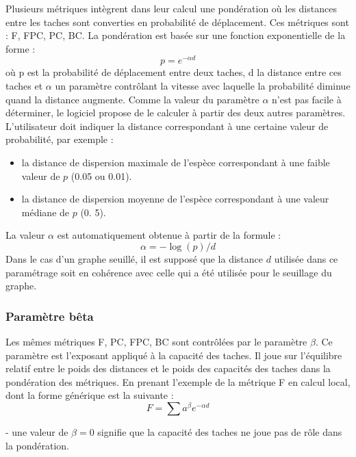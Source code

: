 \documentclass{article}
\begin{document}
Plusieurs métriques intègrent dans leur calcul une pondération où les distances entre les taches sont converties en probabilité de déplacement. Ces métriques sont : F, FPC, PC, BC. La pondération est basée sur une fonction exponentielle de la forme :
\begin{equation*}
p={e}^{-\mathit{\alpha d}}
\end{equation*}
où p est la probabilité de déplacement entre deux taches, d la distance entre ces taches et $\alpha$ un paramètre contrôlant la vitesse avec laquelle la probabilité diminue quand la distance augmente. Comme la valeur du paramètre $\alpha$ n’est pas facile à déterminer, le logiciel propose de le calculer à partir des deux autres paramètres. L’utilisateur doit indiquer la distance correspondant à une certaine valeur de probabilité, par exemple :
\begin{itemize}
	\item la distance de dispersion maximale de l’espèce correspondant à une faible valeur de $p$ (0.05 ou 0.01).
	\item la distance de dispersion moyenne de l’espèce correspondant à une valeur médiane de $p$ (0. 5).
\end{itemize}
La valeur $\alpha $ est automatiquement obtenue à partir de la formule :
\begin{equation*}
\alpha =-\log \left(p\right)/{d}
\end{equation*}
Dans le cas d’un graphe seuillé, il est supposé que la distance $d$ utilisée dans ce paramétrage soit en cohérence avec celle qui a été utilisée pour le seuillage du graphe.

\subsubsection{Paramètre bêta}

Les mêmes métriques F, PC, FPC, BC sont contrôlées par le paramètre $\beta$. Ce paramètre est l’exposant appliqué à la capacité des taches. Il joue sur l’équilibre relatif entre le poids des distances et le poids des capacités des taches dans la pondération des métriques. En prenant l’exemple de la métrique F en calcul local, dont la forme générique est la suivante :
\begin{equation*}
F=\sum {{a}^{\beta }}{e}^{-\mathit{\alpha d}}
\end{equation*}

{}- une valeur de  $\beta =0$ signifie que la capacité des taches ne joue pas de rôle dans la pondération.
\end{document}

